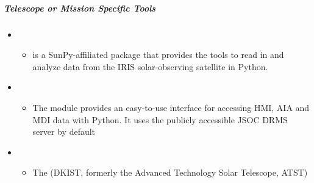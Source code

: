 \documentclass[letterpaper,10pt,english]{sphinxmanual}
\begin{document}
\subparagraph{Telescope or Mission Specific Tools}
\label{\detokenize{resource/astro/topics/solar_physics:telescope-or-mission-specific-tools}}\begin{itemize}
\item {} 
\begin{itemize}
\item {} 
 is a SunPy-affiliated package that provides the tools
to read in and analyze data from the IRIS solar-observing
satellite in Python.

\end{itemize}

\item {} 
\begin{itemize}
\item {} 
The  module provides an easy-to-use interface for
accessing HMI, AIA and MDI data with Python. It uses the publicly
accessible JSOC DRMS server by default

\end{itemize}

\item {} 
\begin{itemize}
\item {} 
The 
(DKIST, formerly the Advanced Technology Solar Telescope, ATST)

\end{itemize}

\end{itemize}
\end{document}
